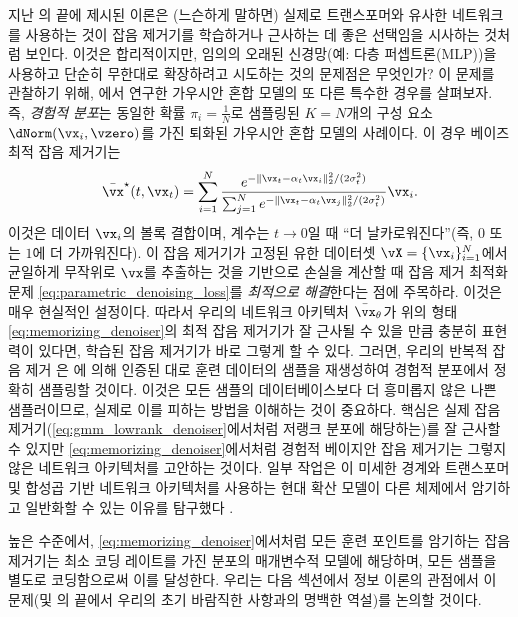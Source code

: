 \documentclass[../../book-main_ko.tex]{subfiles}
\begin{document}
\begin{remark}
	지난 의 끝에 제시된 이론은 (느슨하게 말하면) 실제로 트랜스포머와 유사한 네트워크를 사용하는 것이 잡음 제거기를 학습하거나 근사하는 데 좋은 선택임을 시사하는 것처럼 보인다. 이것은 합리적이지만, 임의의 오래된 신경망(예: 다층 퍼셉트론(MLP))을 사용하고 단순히 무한대로 확장하려고 시도하는 것의 문제점은 무엇인가? 이 문제를 관찰하기 위해, 에서 연구한 가우시안 혼합 모델의 또 다른 특수한 경우를 살펴보자. 즉, \textit{경험적 분포}는 동일한 확률 \(\pi_{i} = \frac{1}{N}\)로 샘플링된 \(K = N\)개의 구성 요소 \(\dNorm(\vx_{i}, \vzero)\)를 가진 퇴화된 가우시안 혼합 모델의 사례이다. 이 경우 베이즈 최적 잡음 제거기는
	\begin{equation}\label{eq:memorizing_denoiser}
		\bar{\vx}^{\star}(t, \vx_{t}) = \sum_{i = 1}^{N}\frac{e^{-\|\vx_{t} - \alpha_{t}\vx_{i}\|_{2}^{2}/(2\sigma_{t}^{2})}}{\sum_{j = 1}^{N}e^{-\|\vx_{t} - \alpha_{t}\vx_{j}\|_{2}^{2}/(2\sigma_{t}^{2})}}\vx_{i}.
	\end{equation}
	이것은 데이터 \(\vx_{i}\)의 볼록 결합이며, 계수는 \(t \to 0\)일 때 ``더 날카로워진다''(즉, \(0\) 또는 \(1\)에 더 가까워진다). 이 잡음 제거기가 고정된 유한 데이터셋 \(\vX = \{\vx_{i}\}_{i = 1}^{N}\)에서 균일하게 무작위로 \(\vx\)를 추출하는 것을 기반으로 손실을 계산할 때 잡음 제거 최적화 문제 \eqref{eq:parametric_denoising_loss}를 \textit{최적으로 해결}한다는 점에 주목하라. 이것은 매우 현실적인 설정이다. 따라서 우리의 네트워크 아키텍처 \(\bar{\vx}_{\theta}\)가 위의 형태 \eqref{eq:memorizing_denoiser}의 최적 잡음 제거기가 잘 근사될 수 있을 만큼 충분히 표현력이 있다면, 학습된 잡음 제거기가 바로 그렇게 할 수 있다. 그러면, 우리의 반복적 잡음 제거 은 에 의해 인증된 대로 훈련 데이터의 샘플을 재생성하여 경험적 분포에서 정확히 샘플링할 것이다. 이것은 모든 샘플의 데이터베이스보다 더 흥미롭지 않은 나쁜 샘플러이므로, 실제로 이를 피하는 방법을 이해하는 것이 중요하다. 핵심은 실제 잡음 제거기(\eqref{eq:gmm_lowrank_denoiser}에서처럼 저랭크 분포에 해당하는)를 잘 근사할 수 있지만 \eqref{eq:memorizing_denoiser}에서처럼 경험적 베이지안 잡음 제거기는 그렇지 않은 네트워크 아키텍처를 고안하는 것이다. 일부 작업은 이 미세한 경계와 트랜스포머 및 합성곱 기반 네트워크 아키텍처를 사용하는 현대 확산 모델이 다른 체제에서 암기하고 일반화할 수 있는 이유를 탐구했다 \citep{kamb2024analytic,niedoba2024towards}.

	높은 수준에서, \eqref{eq:memorizing_denoiser}에서처럼 모든 훈련 포인트를 암기하는 잡음 제거기는 최소 코딩 레이트를 가진 분포의 매개변수적 모델에 해당하며, 모든 샘플을 별도로 코딩함으로써 이를 달성한다. 우리는 다음 섹션에서 정보 이론의 관점에서 이 문제(및 의 끝에서 우리의 초기 바람직한 사항과의 명백한 역설)를 논의할 것이다.
\end{remark}
\end{document}
